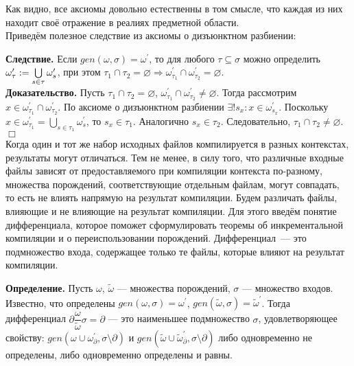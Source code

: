 Как видно, все аксиомы довольно естественны в том смысле, что каждая из них находит своё отражение в реалиях предметной области.\\

Приведём полезное следствие из аксиомы о дизъюнктном разбиении:

\textbf{Следствие.}
Если $gen(\omega, \sigma) = \omega^\prime$, то для любого $\tau \subseteq \sigma$ можно определить $\omega^\prime_\tau := \bigcup\limits_{s\in\tau}\omega^\prime_s$, при этом $\tau_1 \cap \tau_2 = \varnothing \Rightarrow \omega^\prime_{\tau_1} \cap \omega^\prime_{\tau_2} = \varnothing$.\\

\textbf{Доказательство.} Пусть $\tau_1 \cap \tau_2 = \varnothing$, $\omega^\prime_{\tau_1} \cap \omega^\prime_{\tau_2} \neq \varnothing$. Тогда рассмотрим $x \in \omega^\prime_{\tau_1} \cap \omega^\prime_{\tau_2}$. По аксиоме о дизъюнктном разбиении $\exists ! s_x: x \in \omega^\prime_{s_x}$. Поскольку $x \in \omega^\prime_{\tau_1} = \bigcup\limits_{s\in\tau_1}\omega^\prime_s$, то $s_x \in \tau_1$. Аналогично $s_x \in \tau_2$. Следовательно, $\tau_1 \cap \tau_2 \neq \varnothing$. $\Box$\\


Когда один и тот же набор исходных файлов компилируется в разных контекстах, результаты могут отличаться. Тем не менее, в силу того, что различные входные файлы зависят от предоставляемого при компиляции контекста по-разному, множества порождений, соответствующие отдельным файлам, могут совпадать, то есть не влиять напрямую на результат компиляции. Будем различать файлы, влияющие и не влияющие на результат компиляции. Для этого введём понятие дифференциала, которое поможет сформулировать теоремы об инкрементальной компиляции и о переиспользовании порождений. Дифференциал~--- это подмножество входа, содержащее только те файлы, которые влияют на результат компиляции.

\textbf{Определение.} Пусть $\omega$, $\tilde{\omega}$ --- множества порождений, $\sigma$ --- множество входов. Известно, что определены $gen(\omega, \sigma) = \omega^\prime$, $gen(\tilde{\omega}, \sigma) = \tilde{\omega}^\prime$. Тогда дифференциал $\partial\dfrac{\omega}{\tilde{\omega}}\sigma = \partial$ --- это наименьшее подмножество $\sigma$, удовлетворяющее свойству: 
$gen(\omega \cup \omega^\prime_{\partial}, \sigma\setminus\partial)$ и
$gen(\tilde{\omega} \cup \tilde{\omega}^\prime_{\partial}, \sigma\setminus\partial)$ либо одновременно не определены, либо одновременно определены и равны.\\

